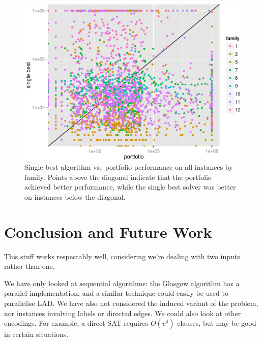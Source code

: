 \documentclass{llncs}
\begin{document}
\begin{figure}[!ht]
\includegraphics[width=\textwidth]{figures/perfScatter}
\caption{Single best algorithm vs.\ portfolio performance on all instances by
family. Points above the diagonal indicate that the portfolio achieved better
performance, while the single best solver was better on instances below the
diagonal.}
\label{fig:scatter}
\end{figure}

\section{Conclusion and Future Work}

This stuff works respectably well, considering we're dealing with two inputs rather than one.

We have only looked at sequential algorithms: the Glasgow algorithm has a parallel implementation,
and a similar technique could easily be used to parallelise LAD.  We have also not considered the
induced variant of the problem, nor instances involving labels or directed edges.  We could also
look at other encodings. For example, a direct SAT requires $O(v^4)$ clauses, but may be good in
certain situations.



\end{document}
